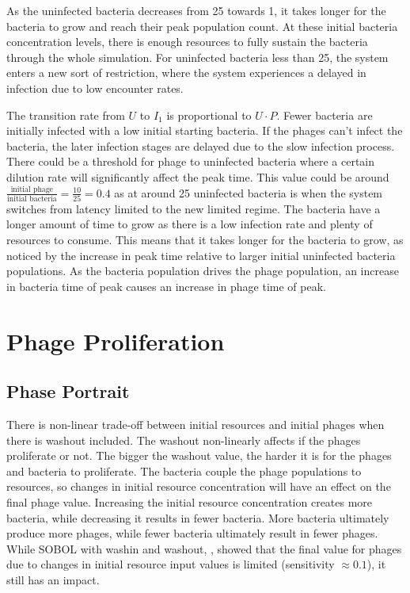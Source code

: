 As the uninfected bacteria decreases from 25 towards 1, it takes longer for the bacteria to grow and reach their peak population count. 
At these initial bacteria concentration levels, there is enough resources to fully sustain the bacteria through the whole simulation. 
For uninfected bacteria less than 25, the system enters a new sort of restriction, where the system experiences a delayed in infection due to low encounter rates. 

The transition rate from $U$ to $I_1$ is proportional to $U\cdot P$. 
Fewer bacteria are initially infected with a low initial starting bacteria. 
If the phages can't infect the bacteria, the later infection stages are delayed due to the slow infection process. 
There could be a threshold for phage to uninfected bacteria where a certain dilution rate will significantly affect the peak time. 
This value could be around $\frac{\text{initial phage}}{\text{initial bacteria}} = \frac{10}{25} = 0.4$ as at around 25 uninfected bacteria is when the system switches from latency limited to the new limited regime. 
The bacteria have a longer amount of time to grow as there is a low infection rate and plenty of resources to consume. 
This means that it takes longer for the bacteria to grow, as noticed by the increase in peak time relative to larger initial uninfected bacteria populations. 
As the bacteria population drives the phage population, an increase in bacteria time of peak causes an increase in phage time of peak. 

\section{Phage Proliferation}
\subsection{Phase Portrait}
There is non-linear trade-off between initial resources and initial phages when there is washout included. 
The washout non-linearly affects if the phages proliferate or not. 
The bigger the washout value, the harder it is for the phages and bacteria to proliferate. 
The bacteria couple the phage populations to resources, so changes in initial resource concentration will have an effect on the final phage value. 
Increasing the initial resource concentration creates more bacteria, while decreasing it results in fewer bacteria.
More bacteria ultimately produce more phages, while fewer bacteria ultimately result in fewer phages.
While SOBOL with washin and washout, , showed that the final value for phages due to changes in initial resource input values is limited (sensitivity $\approx 0.1$), it still has an impact. 

